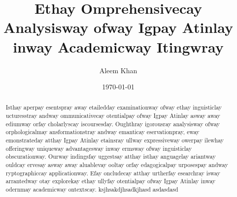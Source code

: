 \documentclass[12pt]{article}
\title{Ethay Omprehensivecay Analysisway ofway Igpay Atinlay inway Academicway Itingwray}
\author{Aleem Khan}
\date{\today}
\begin{document}
\maketitle

\begin{abstract}
Isthay aperpay esentspray away etailedday examinationway ofway ethay inguisticlay ucturesstray andway ommunicativecay otentialpay ofway Igpay Atinlay asway away ediumway orfay cholarlyscay iscoursesday.
Oughthray igorousray analysisway ofway orphologicalmay ansformationstray andway emanticay eservationpray, eway emonstrateday atthay Igpay Atinlay etainsray ullway expressiveway owerpay ilewhay offeringway uniqueway advantagesway inway ermsway ofway inguisticlay obscurationway.
Ourway indingsfay uggestsay atthay isthay anguagelay ariantway ouldcay ervesay asway away aluablevay ooltay orfay edagogicalpay urposespay andway ryptographiccay applicationway.
Efay oncludecay atthay urtherfay esearchray isway arrantedway otay explorekay ethay ullyfay otentialpay ofway Igpay Atinlay inway odernmay academicway ontextscay. ksjhsakdjhsadkjhasd asdasdasd
\end{abstract}
\end{document}
